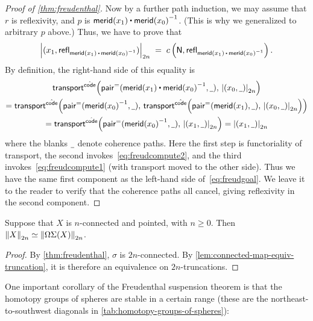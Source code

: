 \begin{proof}[Proof of \autoref{thm:freudenthal}]
  Now by a further path induction, we may assume that $r$ is reflexivity, and $p$ is $\merid(x_1) \ct \opp{\merid(x_0)}$.
  (This is why we generalized to arbitrary $p$ above.)
  Thus, we have to prove that
  \begin{equation}
    \tproj{2n}{(x_1, \refl{\merid(x_1) \ct \opp{\merid(x_0)}})}
    \;=\;
    c\left(\north,\refl{\merid(x_1) \ct \opp{\merid(x_0)}}\right).\label{eq:freudgoal}
  \end{equation}
  By definition, the right-hand side of this equality is
  \begin{multline*}
    \Transfib{\hat{\code}}{\pairpath(\merid(x_1) \ct \opp{\merid(x_0)}, \blank)}{\tproj{2n}{(x_0,\blank)}}\\
    = \Transfib{\hat{\code}}{\pairpath(\opp{\merid(x_0)}, \blank)}
    {\Transfib{\hat{\code}}{\pairpath(\merid(x_1), \blank)}{\tproj{2n}{(x_0,\blank)}}}\\
    = \Transfib{\hat{\code}}{\pairpath(\opp{\merid(x_0)}, \blank)}{\tproj{2n}{(x_1,\blank)}}
    = \tproj{2n}{(x_1,\blank)}
  \end{multline*}
  where the blanks $\blank$ denote coherence paths.
  Here the first step is functoriality of transport, the second invokes~\eqref{eq:freudcompute2}, and the third invokes~\eqref{eq:freudcompute1} (with transport moved to the other side).
  Thus we have the same first component as the left-hand side of~\eqref{eq:freudgoal}.
  We leave it to the reader to verify that the coherence paths all cancel, giving reflexivity in the second component.
\end{proof}


\begin{cor} \label{cor:freudenthal-equiv}
Suppose that $X$ is $n$-connected and pointed, with $n\geq 0$.
Then $\eqv{\trunc{2n}{X}}{\trunc{2n}{\Omega\susp(X)}}$.
\end{cor}
\begin{proof}
By \cref{thm:freudenthal}, $\sigma$ is $2n$-connected.  By
\cref{lem:connected-map-equiv-truncation}, it is therefore an
equivalence on $2n$-truncations.  
\end{proof}


One important corollary of the Freudenthal suspension theorem is that the homotopy groups of
spheres are stable in a certain range (these are the northeast-to-southwest diagonals
in \autoref{tab:homotopy-groups-of-spheres}):

